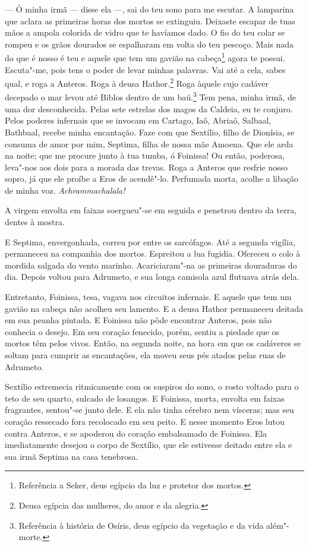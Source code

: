 --- Ó minha irmã --- disse ela ---, sai do teu sono para me escutar. A lamparina que \label{irma}
aclara as primeiras horas dos mortos se extinguiu. Deixaste escapar de
tuas mãos a ampola colorida de vidro que te havíamos dado. O fio do teu
colar se rompeu e os grãos dourados se espalharam em volta do teu pescoço.
Mais nada do que é nosso é teu e aquele que tem um gavião na
cabeça\footnote{ Referência a Seker, deus egípcio da luz e protetor dos mortos.} 
agora te possui. Escuta"-me, pois tens o poder de levar
minhas palavras. Vai até a cela, sabes qual, e roga a Anteros. Roga à
deusa Hathor.\footnote{ Deusa egípcia das mulheres, do amor e da alegria.} 
Roga àquele cujo cadáver decepado o mar levou até Biblos dentro
de um baú.\footnote{ Referência à história de Osíris, deus egípcio da
vegetação e da vida além"-morte.} Tem pena, minha irmã, de uma dor
desconhecida. Pelas sete estrelas dos magos da Caldeia, eu te conjuro.
Pelos poderes infernais que se invocam em Cartago, Iaô, Abriaô, Salbaal,
Bathbaal, recebe minha encantação. Faze com que Sextílio, filho de
Dionísia, se consuma de amor por mim, Septima, filha de nossa mãe Amoena.
Que ele arda na noite; que me procure junto à tua tumba, ó Foinissa! Ou
então, poderosa, leva"-nos aos dois para a morada das trevas. Roga a
Anteros que resfrie nosso sopro, já que ele proíbe a Eros de acendê"-lo.
Perfumada morta, acolhe a libação de minha voz. \textit{Achrammachalala!}

A virgem envolta em faixas soergueu"-se em seguida e penetrou dentro da
terra, dentes à mostra.

E Septima, envergonhada, correu por entre os sarcófagos. Até a segunda
vigília, permaneceu na companhia dos mortos. Espreitou a lua fugidia.
Ofereceu o colo à mordida salgada do vento marinho. Acariciaram"-na as
primeiras douraduras do dia. Depois voltou para Adrumeto, e sua longa
camisola azul flutuava atrás dela.

Entretanto, Foinissa, tesa, vagava nos circuitos infernais. E aquele que tem
um gavião na cabeça não acolheu seu lamento. E a deusa Hathor permaneceu
deitada em sua peanha pintada. E Foinissa não pôde encontrar Anteros, pois
não conhecia o desejo. Em seu coração fenecido, porém, sentiu a piedade
que os mortos têm pelos vivos. Então, na segunda noite, na hora em que os
cadáveres se soltam para cumprir as encantações, ela moveu seus pés atados
pelas ruas de Adrumeto.

Sextílio estremecia ritmicamente com os suspiros do sono, o rosto voltado
para o teto de seu quarto, sulcado de losangos. E Foinissa, morta, envolta \label{viscera}
em faixas fragrantes, sentou"-se junto dele. E ela não tinha cérebro nem
vísceras; mas seu coração ressecado fora recolocado em seu peito. E nesse
momento Eros lutou contra Anteros, e se apoderou do coração embalsamado de
Foinissa. Ela imediatamente desejou o corpo de Sextílio, que ele estivesse
deitado entre ela e sua irmã Septima na casa tenebrosa.

